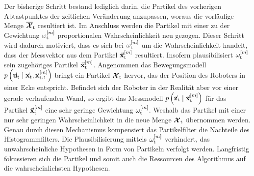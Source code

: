 Der bisherige Schritt bestand lediglich darin, die Partikel des vorherigen Abtastpunktes der zeitlichen Veränderung anzupassen, woraus die vorläufige Menge $\overline{\boldsymbol{\mathcal{X}}}_{\text{t}}$ resultiert ist. Im Anschluss werden die Partikel mit einer zu der Gewichtung $\omega_{\text{t}}^{[m]}$ proportionalen Wahrscheinlichkeit neu gezogen. Dieser Schritt wird dadurch motiviert, dass es sich bei $\omega_{\text{t}}^{[m]}$ um die Wahrscheinlichkeit handelt, dass der Messvektor aus dem Partikel $\vec{\mathbf{x}}_{\text{t}}^{[m]}$ resultiert. Insofern plausibilisiert $\omega_{\text{t}}^{[m]}$ sein zugehöriges Partikel $\vec{\mathbf{x}}_{\text{t}}^{[m]}$. Angenommen das Bewegungsmodell $p\left({\vec{\mathbf{u}}_{\text{t}}} \hspace{1mm} \vert \hspace{1mm} {\vec{\mathbf{x}}_{\text{t}}, \vec{\mathbf{x}}_{\text{t-1}}^{[m]}}\right)$ bringt ein Partikel $\boldsymbol{\mathcal{X}}_{\text{t}}$ hervor, das der Position des Roboters in einer Ecke entspricht. Befindet sich der Roboter in der Realität aber vor einer gerade verlaufenden Wand, so ergibt das Messmodell $p\left({\vec{\mathbf{z}}_{\text{t}}} \hspace{1mm} \vert \hspace{1mm} {\vec{\mathbf{x}}_{\text{t}}^{[m]}}\right)$ für das Partikel $\vec{\mathbf{x}}_{\text{t}}^{[m]}$ eine sehr geringe Gewichtung $\omega_{\text{t}}^{[m]}$. Weshalb das Partikel mit einer nur sehr geringen Wahrscheinlichkeit in die neue Menge $\boldsymbol{\mathcal{X}}_{\text{t}}$ übernommen werden. Genau durch diesen Mechanismus kompensiert das Partikelfilter die Nachteile des Histogrammfilters. Die Plausibilisierung mittels $\omega_{\text{t}}^{[m]}$ verhindert, das unwahrscheinliche Hypothesen in Form von Partikeln verfolgt werden. Langfristig fokussieren sich die Partikel und somit auch die Ressourcen des Algorithmus auf die wahrscheinlichsten Hypothesen.